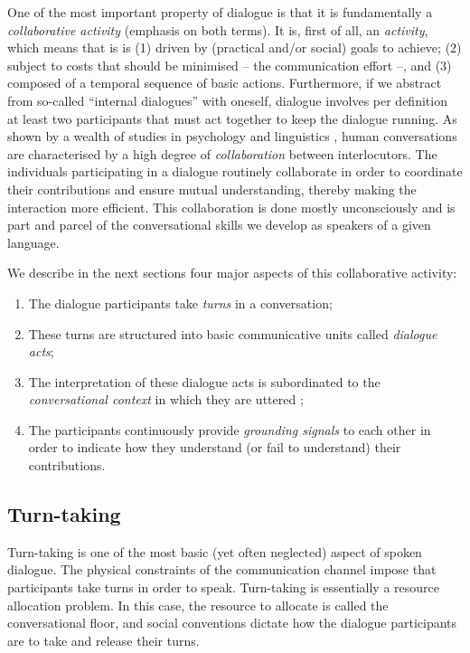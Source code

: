 One of the most important property of dialogue is that it is fundamentally a \textit{collaborative activity} (emphasis on both terms).  It is, first of all, an \textit{activity}, which means that is is (1) driven by (practical and/or social) goals to achieve; (2) subject to costs that should be minimised -- the communication effort --, and (3) composed of a temporal sequence of basic actions.  Furthermore, if we abstract from so-called ``internal dialogues'' with oneself, dialogue involves per definition at least two participants that must act together to keep the dialogue running.  As shown by a wealth of studies in psychology and linguistics \citep{Clark1989,Allwood92,Clark96,Garrod2004,Tomasello2005}, human conversations are characterised by a high degree of \textit{collaboration} between interlocutors.  The individuals participating in a dialogue routinely collaborate in order to coordinate their contributions and ensure mutual understanding, thereby making the interaction more efficient. This collaboration is done mostly unconsciously and is part and parcel of the conversational skills we develop as speakers of a given language. 

We describe in the next sections four major aspects of this collaborative activity: \begin{enumerate}
\item The dialogue participants take \textit{turns} in a conversation;
\item These turns are structured into basic communicative units called \textit{dialogue acts};
\item The interpretation of these dialogue acts is subordinated to the \textit{conversational context} in which they are uttered ; 
\item The participants continuously provide \textit{grounding signals} to each other in order to indicate how they understand (or fail to understand) their contributions.
\end{enumerate}

\subsection{Turn-taking}

Turn-taking is one of the most basic (yet often neglected) aspect of spoken dialogue. The physical constraints of the communication channel impose that participants take turns in order to speak.   Turn-taking is essentially a resource allocation problem.  In this case, the resource to allocate is called the conversational floor, and social conventions dictate how the dialogue participants are to take and release their turns. 

